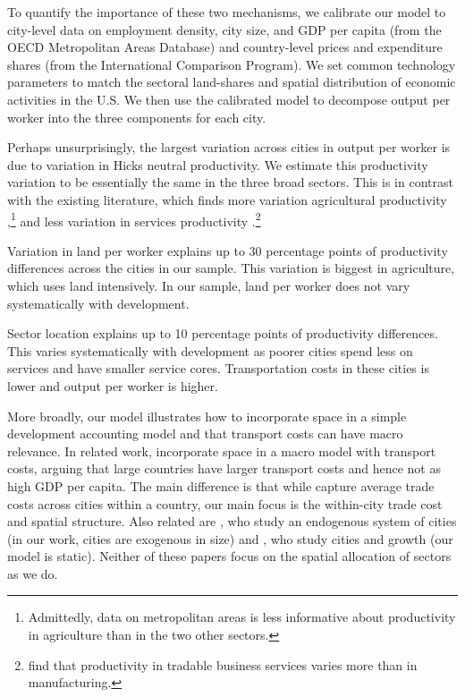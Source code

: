 \documentclass[12pt]{article}
\begin{document}
To quantify the importance of these two mechanisms, we calibrate our model to city-level data on employment density, city size, and GDP per capita (from the OECD Metropolitan Areas Database) and country-level prices and expenditure shares (from the International Comparison Program). We set common technology parameters to match the sectoral land-shares and spatial distribution of economic activities in the U.S. We then use the calibrated model to decompose output per worker into the three components for each city.

Perhaps unsurprisingly, the largest variation across cities in output per worker is due to variation in Hicks neutral productivity. We estimate this productivity variation to be essentially the same in the three broad sectors. This is in contrast with the existing literature, which finds more variation agricultural productivity \cite{Caselli05,Restuccia08},\footnote{Admittedly, data on metropolitan areas is less informative about productivity in agriculture than in the two other sectors.} and less variation in services productivity \cite{Balassa64,Samuelson64,Herrendorf2012-yg}.\footnote{ find that productivity in tradable business services varies more than in manufacturing.}

Variation in land per worker explains up to 30 percentage points of productivity differences across the cities in our sample. This variation is biggest in agriculture, which uses land intensively. In our sample, land per worker does not vary systematically with development. 

Sector location explains up to 10 percentage points of productivity differences. This varies systematically with development as poorer cities spend less on services and have smaller service cores. Transportation costs in these cities is lower and output per worker is higher.

More broadly, our model illustrates how to incorporate space in a simple development accounting model and that transport costs can have macro relevance. In related work,  incorporate space in a macro model with transport costs, arguing that large countries have larger transport costs and hence not as high GDP per capita. The main difference is that while  capture average trade costs across cities within a country, our main focus is the within-city trade cost and spatial structure. Also related are , who study an endogenous system of cities (in our work, cities are exogenous in size) and , who study cities and growth (our model is static). Neither of these papers focus on the spatial allocation of sectors as we do.
\end{document}
